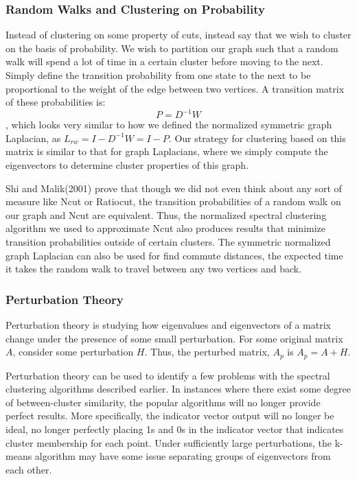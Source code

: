 \documentclass{article}
\begin{document}
\subsubsection{Random Walks and Clustering on Probability}

Instead of clustering on some property of cuts, instead say that we wish to cluster on the basis of probability. We wish to partition our graph such that a random walk will spend a lot of time in a certain cluster before moving to the next. Simply define the transition probability from one state to the next to be proportional to the weight of the edge between two vertices. A transition matrix of these probabilities is: $$P = D^{-1}W$$, which looks very similar to how we defined the normalized symmetric graph Laplacian, as $L_{rw} = I - D^{-1}W = I -P$. Our strategy for clustering based on this matrix is similar to that for graph Laplacians, where we simply compute the eigenvectors to determine cluster properties of this graph. 

Shi and Malik(2001) prove that though we did not even think about any sort of measure like Ncut or Ratiocut, the transition probabilities of a random walk on our graph and Ncut are equivalent. Thus, the normalized spectral clustering algorithm we used to approximate Ncut also produces results that minimize transition probabilities outside of certain clusters. The symmetric normalized graph Laplacian can also be used for find commute distances, the expected time it takes the random walk to travel between any two vertices and back.

\subsubsection{Perturbation Theory}

Perturbation theory is studying how eigenvalues and eigenvectors of a matrix change under the presence of some small perturbation. For some original matrix $A$, consider some perturbation $H$. Thus, the perturbed matrix, $A_p$ is $A_p = A + H$. 

Perturbation theory can be used to identify a few problems with the spectral clustering algorithms described earlier. In instances where there exist some degree of between-cluster similarity, the popular algorithms will no longer provide perfect results. More specifically, the indicator vector output will no longer be ideal, no longer perfectly placing 1s and 0s in the indicator vector that indicates cluster membership for each point. Under sufficiently large perturbations, the k-means algorithm may have some issue separating groups of eigenvectors from each other.


            
\end{document}
